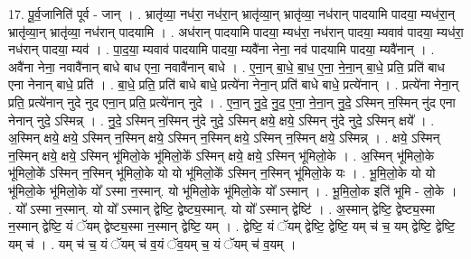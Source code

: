\documentclass[17pt]{extarticle}
\begin{document}
17. पू॒र्व॒जानिति॑ पूर्व - जान् । . भ्रातृ॑व्या॒ नध॑रा॒ नध॑रा॒न् भ्रातृ॑व्या॒न् भ्रातृ॑व्या॒ नध॑रान् पादयामि पादया॒ म्यध॑रा॒न् भ्रातृ॑व्या॒न् भ्रातृ॑व्या॒ नध॑रान् पादयामि । . अध॑रान् पादयामि पादया॒ म्यध॑रा॒ नध॑रान् पादया॒ म्यवाव॑ पादया॒ म्यध॑रा॒ नध॑रान् पादया॒ म्यव॑ । . पा॒द॒या॒ म्यवाव॑ पादयामि पादया॒ म्यवै॑ना नेना॒ नव॑ पादयामि पादया॒ म्यवै॑नान् । . अवै॑ना नेना॒ नवावै॑नान् बाधे बाध एना॒ नवावै॑नान् बाधे । . ए॒ना॒न् बा॒धे॒ बा॒ध॒ ए॒ना॒ ने॒ना॒न् बा॒धे॒ प्रति॒ प्रति॑ बाध एना नेनान् बाधे॒ प्रति॑ । . बा॒धे॒ प्रति॒ प्रति॑ बाधे बाधे॒ प्रत्ये॑ना नेना॒न् प्रति॑ बाधे बाधे॒ प्रत्ये॑नान् । . प्रत्ये॑ना नेना॒न् प्रति॒ प्रत्ये॑नान् नुदे नुद एना॒न् प्रति॒ प्रत्ये॑नान् नुदे । . ए॒ना॒न् नु॒दे॒ नु॒द॒ ए॒ना॒ ने॒ना॒न् नु॒दे॒ ऽस्मिन् न॒स्मिन् नु॑द एना नेनान् नुदे॒ ऽस्मिन्न् । . नु॒दे॒ ऽस्मिन् न॒स्मिन् नु॑दे नुदे॒ ऽस्मिन् क्षये॒ क्षये॒ ऽस्मिन् नु॑दे नुदे॒ ऽस्मिन् क्षये᳚ । . अ॒स्मिन् क्षये॒ क्षये॒ ऽस्मिन् न॒स्मिन् क्षये॒ ऽस्मिन् न॒स्मिन् क्षये॒ ऽस्मिन् न॒स्मिन् क्षये॒ ऽस्मिन्न् । . क्षये॒ ऽस्मिन् न॒स्मिन् क्षये॒ क्षये॒ ऽस्मिन् भू॑मिलो॒के भू॑मिलो॒के᳚ ऽस्मिन् क्षये॒ क्षये॒ ऽस्मिन् भू॑मिलो॒के । . अ॒स्मिन् भू॑मिलो॒के भू॑मिलो॒के᳚ ऽस्मिन् न॒स्मिन् भू॑मिलो॒के यो यो भू॑मिलो॒के᳚ ऽस्मिन् न॒स्मिन् भू॑मिलो॒के यः । . भू॒मि॒लो॒के यो यो भू॑मिलो॒के भू॑मिलो॒के यो᳚ ऽस्मा न॒स्मान्. यो भू॑मिलो॒के भू॑मिलो॒के यो᳚ ऽस्मान् । . भू॒मि॒लो॒क इति॑ भूमि - लो॒के । . यो᳚ ऽस्मा न॒स्मान्. यो यो᳚ ऽस्मान् द्वेष्टि॒ द्वेष्ट्य॒स्मान्. यो यो᳚ ऽस्मान् द्वेष्टि॑ । . अ॒स्मान् द्वेष्टि॒ द्वेष्ट्य॒स्मा न॒स्मान् द्वेष्टि॒ यं ॅयम् द्वेष्ट्य॒स्मा न॒स्मान् द्वेष्टि॒ यम् । . द्वेष्टि॒ यं ॅयम् द्वेष्टि॒ द्वेष्टि॒ यम् च॑ च॒ यम् द्वेष्टि॒ द्वेष्टि॒ यम् च॑ । . यम् च॑ च॒ यं ॅयम् च॑ व॒यं ॅव॒यम् च॒ यं ॅयम् च॑ व॒यम् । \newline
\end{document}
